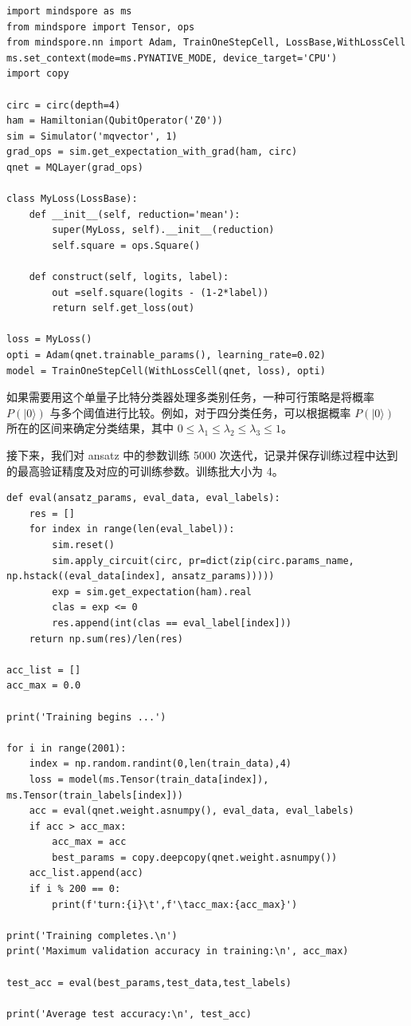 \begin{lstlisting}
import mindspore as ms
from mindspore import Tensor, ops
from mindspore.nn import Adam, TrainOneStepCell, LossBase,WithLossCell
ms.set_context(mode=ms.PYNATIVE_MODE, device_target='CPU')
import copy

circ = circ(depth=4)
ham = Hamiltonian(QubitOperator('Z0'))
sim = Simulator('mqvector', 1)
grad_ops = sim.get_expectation_with_grad(ham, circ)
qnet = MQLayer(grad_ops)

class MyLoss(LossBase):
    def __init__(self, reduction='mean'):
        super(MyLoss, self).__init__(reduction)
        self.square = ops.Square()

    def construct(self, logits, label):
        out =self.square(logits - (1-2*label))
        return self.get_loss(out)

loss = MyLoss()
opti = Adam(qnet.trainable_params(), learning_rate=0.02)
model = TrainOneStepCell(WithLossCell(qnet, loss), opti)

\end{lstlisting}
如果需要用这个单量子比特分类器处理多类别任务，一种可行策略是将概率 $P(|0\rangle)$ 与多个阈值进行比较。例如，对于四分类任务，可以根据概率 $P(|0\rangle)$ 所在的区间来确定分类结果，其中 $0\leqslant\lambda_1\leqslant\lambda_2\leqslant\lambda_3\leqslant1$。

接下来，我们对 ansatz 中的参数训练 5000 次迭代，记录并保存训练过程中达到的最高验证精度及对应的可训练参数。训练批大小为 4。

\begin{lstlisting}
def eval(ansatz_params, eval_data, eval_labels):
    res = []
    for index in range(len(eval_label)):
        sim.reset()
        sim.apply_circuit(circ, pr=dict(zip(circ.params_name, np.hstack((eval_data[index], ansatz_params)))))
        exp = sim.get_expectation(ham).real
        clas = exp <= 0
        res.append(int(clas == eval_label[index]))
    return np.sum(res)/len(res)

acc_list = []
acc_max = 0.0

print('Training begins ...')

for i in range(2001):
    index = np.random.randint(0,len(train_data),4)
    loss = model(ms.Tensor(train_data[index]), ms.Tensor(train_labels[index]))
    acc = eval(qnet.weight.asnumpy(), eval_data, eval_labels)
    if acc > acc_max:
        acc_max = acc
        best_params = copy.deepcopy(qnet.weight.asnumpy())
    acc_list.append(acc)
    if i % 200 == 0:
        print(f'turn:{i}\t',f'\tacc_max:{acc_max}')

print('Training completes.\n')
print('Maximum validation accuracy in training:\n', acc_max)

test_acc = eval(best_params,test_data,test_labels)

print('Average test accuracy:\n', test_acc)
\end{lstlisting}

